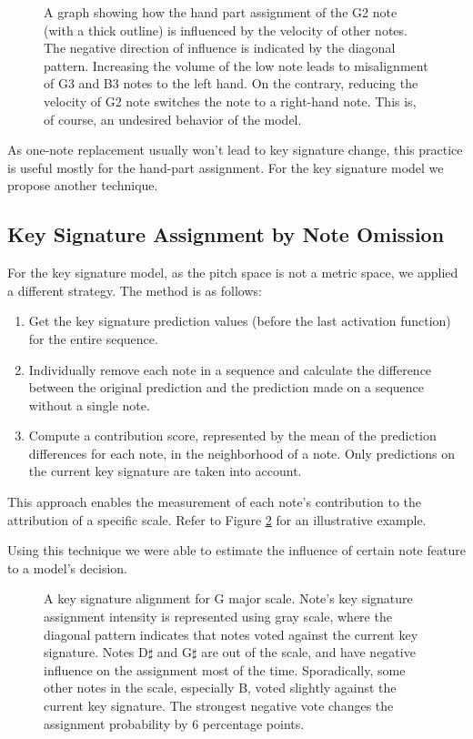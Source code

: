 \begin{figure}[ht!]
\centering

\caption[Velocity influence on hand part assignment.]{A graph showing how the hand part assignment of the G2 note (with a thick outline) is influenced by the velocity of other notes. The negative direction of influence is indicated by the diagonal pattern. Increasing the volume of the low note leads to misalignment of G3 and B3 notes to the left hand. On the contrary, reducing the velocity of G2 note switches the note to a right-hand note. This is, of course, an undesired behavior of the model.}
\label{hand_part_misalignment}\end{figure}

As one-note replacement usually won't lead to key signature change, this practice is useful mostly for the hand-part assignment. For the key signature model we propose another technique.

\subsection{Key Signature Assignment by Note Omission}

For the key signature model, as the pitch space is not a metric space, we applied a different strategy. The method is as follows: \begin{enumerate}
	\item Get the key signature prediction values (before the last activation function) for the entire sequence.
	\item Individually remove each note in a sequence and calculate the difference between the original prediction and the prediction made on a sequence without a single note.
	\item Compute a contribution score, represented by the mean of the prediction differences for each note, in the neighborhood of a note. Only predictions on the current key signature are taken into account.
	\end{enumerate} This approach enables the measurement of each note's contribution to the attribution of a specific scale. Refer to Figure \ref{note_removing} for an illustrative example.
	
Using this technique we were able to estimate the influence of certain note feature to a model's decision.

\begin{figure}[ht!]
\centering

\caption[A key signature alignment for G scale.]{A key signature alignment for G major scale. Note's key signature assignment intensity is represented using gray scale, where the diagonal pattern indicates that notes voted against the current key signature. Notes D$\sharp$ and G$\sharp$ are out of the scale, and have negative influence on the assignment most of the time. Sporadically, some other notes in the scale, especially B, voted slightly against the current key signature. The strongest negative vote changes the assignment probability by $6$ percentage points.}
\label{note_removing}\end{figure}

